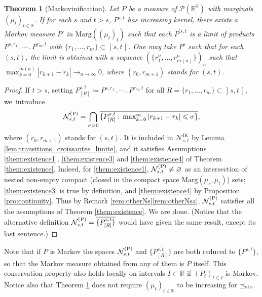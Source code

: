 \documentclass[JEP,XML,SOM,Unicode,NoEqCountersInSection,NoFloatCountersInSection,published]{cedram}
\newcommand{\ldot}{\mathbin{.}}
\newcommand{\lcdots}{\ldot\cdots\ldot}
\theoremstyle{plain}
\newtheorem{them}{Theorem}[section]
\theoremstyle{definition}
\newcommand{\IT}{\mathrm{IK}}
\newcommand{\eqdef}{\coloneqq}
\newcommand{\p}{\mathcal{P}}
\newcommand{\ma}{\mathrm{Marg}}
\newcommand{\R}{\mathbb{R}}
\newcommand{\leqs}{\preceq_{\text{\rm sto}}}
\newcommand{\op}{\mathopen}
\newcommand{\clo}{\mathclose}
\begin{document}
\begin{them}[Markovinification]\label{them:sous_n}
Let $P$ be a measure of\/ $\p(\R^\R)$ with marginals $(\mu_t)_{t\in \R}$. If for each $s$ and $t>s$, $P^{s,t}$ has increasing kernel, there exists a Markov measure $P'$ in $\ma((\mu_t)_t)$ such that each $P^{\prime s,t}$ is a limit of products $P^{s,r_1}\lcdots P^{r_m,t}$ with $\{r_1,\ldots,r_m\}\subset\op]s,t\clo[$. One may take $P'$ such that for each $(s,t)$, the limit is obtained with a sequence $(\{r^n_1,\ldots,r^n_{m(n)}\})_n$ such that $\max_{k=0}^{m(n)} |r_{k+1}-r_k|\to_{n\to\infty}0$, where $(r_0,r_{m+1})$ stands for $(s,t)$.
\end{them}

\begin{proof} If $t>s$, setting $P_{[R]}^{s,t}\eqdef P^{s,r_1}\lcdots P^{r_m,t}$ for all $R=\{r_1,\ldots,r_m\}\subset\op]s,t\clo[$, we~introduce
\[
\mathcal{N}_{s,t}^{\rm (P)}=\bigcap_{\sigma>0}\overline{\{P_{[R]}^{s,t}:\,\max\nolimits_{k=0}^m |r_{k+1}-r_k|\leqslant\sigma\}},
\]
where $(r_0,r_{m+1})$ stands for $(s,t)$. It is included in $\mathcal{N}_{s,t}^\IT$ by Lemma \ref{lem:transitions_croissantes_limite}, and it satisfies Assumptions \eqref{them:existence1}, \eqref{them:existence3} and \eqref{them:existence4} of Theorem \ref{them:existence}. Indeed, for \eqref{them:existence1}, $\mathcal{N}_{s,t}^{\rm (P)}\neq\varnothing$ as an intersection of nested non-empty compact (closed in the compact space $\ma(\mu_s,\mu_t)$) sets; \eqref{them:existence3} is true by definition, and \eqref{them:existence4} by Proposition \ref{pro:continuity}. Thus by Remark \ref{rem:otherNs}\eqref{rem:otherNsa}, $\mathcal{N}_{s,t}^{\rm (P)}$ satisfies all the assumptions of Theorem \ref{them:existence}. We are done. (Notice that the alternative definition $\mathcal{N}_{s,t}^{\rm (P)}=\overline{\{P_{[R]}^{s,t}\}}$ would have given the same result, except its last sentence.)
\end{proof}

Note that if $P$ is Markov the spaces $\mathcal{N}_{s,t}^{\rm (P)}$ and $\overline{\{P_{[R]}^{s,t}\}}$ are both reduced to $\{P^{s,t}\}$, so that the Markov measure obtained from any of them is $P$ itself. This conservation property also holds locally on intervals $I\subset \R$ if $(P_t)_{t\in I}$ is Markov. Notice also that Theorem \ref{them:sous_n} does not require $(\mu_t)_{t\in\R}$ to be increasing for $\leqs $.
\end{document}
